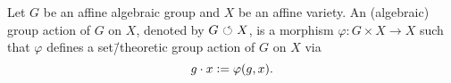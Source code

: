 \begin{defi}
	Let $G$ be an affine algebraic group and $X$ be an affine variety. An (algebraic) group action of $G$ on $X$, denoted by $G{\ \circlearrowleft\ } X$, is a morphism $\varphi\colon G\times X \rightarrow X$ such that $\varphi$ defines a set\=/theoretic group action of $G$ on $X$ via
	$$g\cdot x \mathrel{\mathop:}= \varphi(g,x).$$
\end{defi}


